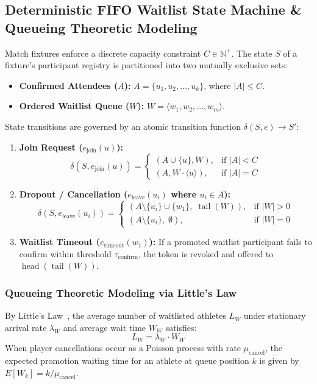 \documentclass[conference]{IEEEtran}
\begin{document}
\subsection{Deterministic FIFO Waitlist State Machine \& Queueing Theoretic Modeling}
Match fixtures enforce a discrete capacity constraint $C \in \mathbb{N}^+$. The state $S$ of a fixture's participant registry is partitioned into two mutually exclusive sets:
\begin{itemize}
    \item \textbf{Confirmed Attendees ($A$):} $A = \{u_1, u_2, \dots, u_k\}$, where $|A| \le C$.
    \item \textbf{Ordered Waitlist Queue ($W$):} $W = \langle w_1, w_2, \dots, w_m \rangle$.
\end{itemize}

State transitions are governed by an atomic transition function $\delta(S, e) \to S'$:
\begin{enumerate}
    \item \textbf{Join Request ($e_{\text{join}}(u)$):}
    \begin{equation}
    \delta(S, e_{\text{join}}(u)) = 
    \begin{cases}
    (A \cup \{u\}, W), & \text{if } |A| < C \\
    (A, W \cdot \langle u \rangle), & \text{if } |A| = C
    \end{cases}
    \end{equation}
    \item \textbf{Dropout / Cancellation ($e_{\text{leave}}(u_i)$ where $u_i \in A$):}
    \begin{equation}
    \delta(S, e_{\text{leave}}(u_i)) = 
    \begin{cases}
    (A \setminus \{u_i\} \cup \{w_1\}, \;\operatorname{tail}(W)), & \text{if } |W| > 0 \\
    (A \setminus \{u_i\}, \;\emptyset), & \text{if } |W| = 0
    \end{cases}
    \end{equation}
    \item \textbf{Waitlist Timeout ($e_{\text{timeout}}(w_1)$):} If a promoted waitlist participant fails to confirm within threshold $\tau_{\text{confirm}}$, the token is revoked and offered to $\operatorname{head}(\operatorname{tail}(W))$.
\end{enumerate}

\subsubsection{Queueing Theoretic Modeling via Little's Law}
By Little's Law~\cite{little1961proof}, the average number of waitlisted athletes $L_W$ under stationary arrival rate $\lambda_W$ and average wait time $W_W$ satisfies:
\begin{equation}
L_W = \lambda_W \cdot W_W
\end{equation}
When player cancellations occur as a Poisson process with rate $\mu_{\text{cancel}}$, the expected promotion waiting time for an athlete at queue position $k$ is given by $E[W_k] = k / \mu_{\text{cancel}}$.
\end{document}
